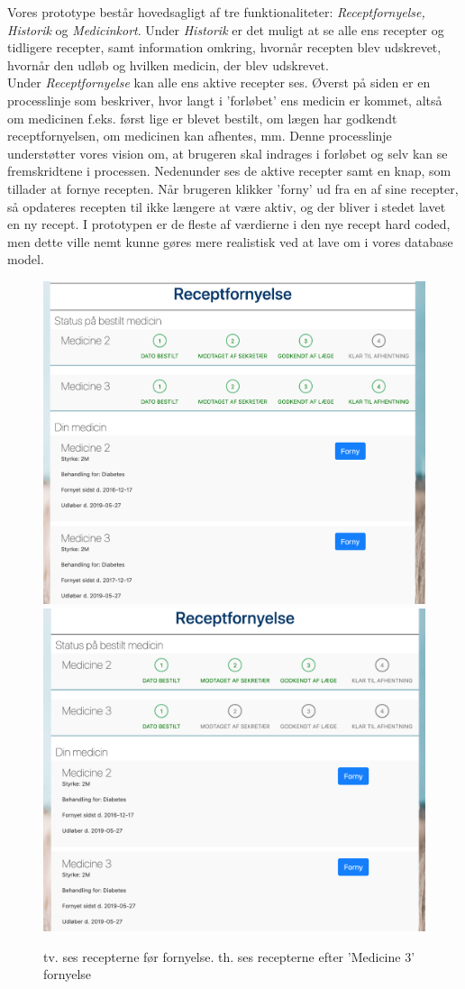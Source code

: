 Vores prototype består hovedsagligt af tre funktionaliteter: \textit{Receptfornyelse, Historik} og \textit{Medicinkort}. Under \textit{Historik} er det muligt at se alle ens recepter og tidligere recepter, samt information omkring, hvornår recepten blev udskrevet, hvornår den udløb og hvilken medicin, der blev udskrevet.\\
Under \textit{Receptfornyelse} kan alle ens aktive recepter ses. Øverst på siden er en processlinje som beskriver, hvor langt i 'forløbet' ens medicin er kommet, altså om medicinen f.eks. først lige er blevet bestilt, om lægen har godkendt receptfornyelsen, om medicinen kan afhentes, mm. Denne processlinje understøtter vores vision om, at brugeren skal indrages i forløbet og selv kan se fremskridtene i processen. Nedenunder ses de aktive recepter samt en knap, som tillader at fornye recepten. Når brugeren klikker 'forny' ud fra en af sine recepter, så opdateres recepten til ikke længere at være aktiv, og der bliver i stedet lavet en ny recept. I prototypen er de fleste af værdierne i den nye recept hard coded, men dette ville nemt kunne gøres mere realistisk ved at lave om i vores database model.
\begin{figure}[h!]
	\includegraphics[width=0.49\linewidth]{Materials/Prototype/Receptfornyelse}
	\includegraphics[width=0.49\linewidth]{Materials/Prototype/ReceptfornyelseFornyet}
	\caption{tv. ses recepterne før fornyelse. th. ses recepterne efter 'Medicine 3' fornyelse}
\end{figure}
